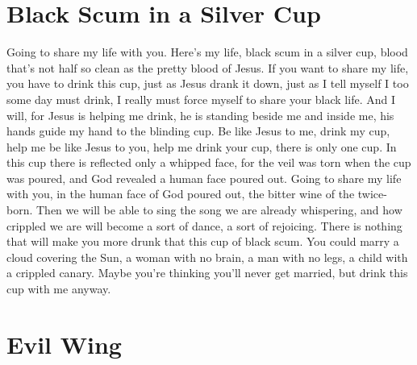 \documentclass[english,11pt,letterpaper,onecolumn,parskip=full]{scrbook}
\begin{document}
\newpage
\section{Black Scum in a Silver Cup}

\begin{poem}
\begin{stanza}
Going to share my life with you.\verseline
Here's my life, black scum in a silver cup, blood that's not half so clean as the pretty blood of Jesus.\verseline
If you want to share my life, you have to drink this cup, just as Jesus drank it down, just as I tell myself I too some day must drink, I really must force myself to share your black life.\verseline
And I will, for Jesus is helping me drink, he is standing beside me and inside me, his hands guide my hand to the blinding cup.\verseline
Be like Jesus to me, drink my cup, help me be like Jesus to you, help me drink your cup, there is only one cup.\verseline
In this cup there is reflected only a whipped face, for the veil was torn when the cup was poured, and God revealed a human face poured out.\verseline
Going to share my life with you, in the human face of God poured out, the bitter wine of the twice-born.\verseline
Then we will be able to sing the song we are already whispering, and how crippled we are will become a sort of dance, a sort of rejoicing.\verseline
There is nothing that will make you more drunk that this cup of black scum.\verseline
You could marry a cloud covering the Sun, a woman with no brain, a man with no legs, a child with a crippled canary.\verseline
Maybe you're thinking you'll never get married, but drink this cup with me anyway.
\end{stanza}
\end{poem}


\newpage
\section{Evil Wing}
\end{document}

